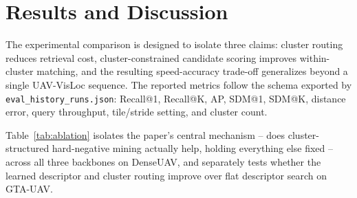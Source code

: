 \documentclass[conference]{IEEEtran}
\begin{document}
\section{Results and Discussion}
The experimental comparison is designed to isolate three claims: cluster
routing reduces retrieval cost, cluster-constrained candidate scoring improves
within-cluster matching, and the resulting speed-accuracy trade-off generalizes
beyond a single UAV-VisLoc sequence. The reported metrics follow the schema
exported by \texttt{eval\_history\_runs.json}: Recall@1, Recall@K, AP,
SDM@1, SDM@K, distance error, query throughput, tile/stride setting, and
cluster count.

Table~\ref{tab:ablation} isolates the paper's central mechanism -- does
cluster-structured hard-negative mining actually help, holding everything
else fixed -- across all three backbones on DenseUAV, and separately tests
whether the learned descriptor and cluster routing improve over flat
descriptor search on GTA-UAV.
\end{document}
